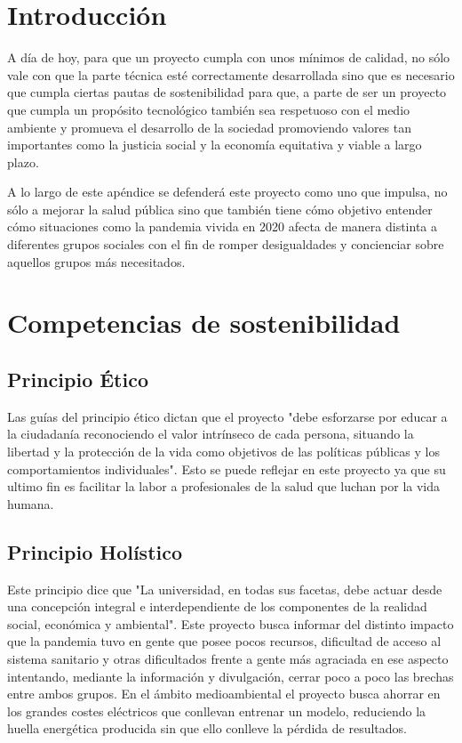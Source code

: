 
\section{Introducción}

A día de hoy, para que un proyecto cumpla con unos mínimos de calidad, no sólo vale con que la parte técnica esté correctamente desarrollada sino que es necesario que cumpla ciertas pautas de sostenibilidad para que, a parte de ser un proyecto que cumpla un propósito tecnológico también sea respetuoso con el medio ambiente y promueva el desarrollo de la sociedad promoviendo valores tan importantes como la justicia social y la economía equitativa y viable a largo plazo.

A lo largo de este apéndice se defenderá este proyecto como uno que impulsa, no sólo a mejorar la salud pública sino que también tiene cómo objetivo entender cómo situaciones como la pandemia vivida en 2020 afecta de manera distinta a diferentes grupos sociales con el fin de romper desigualdades y concienciar sobre aquellos grupos más necesitados.

\section{Competencias de sostenibilidad}

\subsection{Principio Ético}

Las guías del principio ético dictan que el proyecto "debe esforzarse por educar a la ciudadanía reconociendo el valor intrínseco de cada persona, situando la libertad y la protección de la vida como objetivos de las políticas públicas y los comportamientos individuales". Esto se puede reflejar en este proyecto ya que su ultimo fin es facilitar la labor a profesionales de la salud que luchan por la vida humana.

\subsection{Principio Holístico}

Este principio dice que "La universidad, en todas sus facetas, debe actuar desde una concepción integral e interdependiente de los componentes de la realidad social, económica y ambiental". Este proyecto busca informar del distinto impacto que la pandemia tuvo en gente que posee pocos recursos, dificultad de acceso al sistema sanitario y otras dificultados frente a gente más agraciada en ese aspecto intentando, mediante la información y divulgación, cerrar poco a poco las brechas entre ambos grupos. En el ámbito medioambiental el proyecto busca ahorrar en los grandes costes eléctricos que conllevan entrenar un modelo, reduciendo la huella energética producida sin que ello conlleve la pérdida de resultados.

